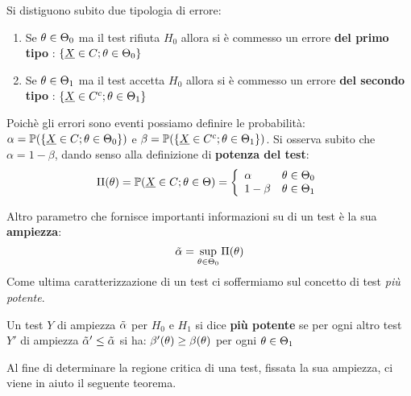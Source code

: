 Si distiguono subito due tipologia di errore:
\begin{enumerate}
    \item Se $\theta\in\Theta_0$ ma il test rifiuta $H_0$ allora si è commesso un errore \textbf{del primo tipo} : $\{\underline{X}\in C ; \theta\in\Theta_0\}$
    \item Se $\theta\in\Theta_1$ ma il test accetta $H_0$ allora si è commesso un errore \textbf{del secondo tipo} : $\{\underline{X}\in C^c ; \theta\in\Theta_1\}$
\end{enumerate}
Poichè gli errori sono eventi possiamo definire le probabilità: $\alpha = \mathbb{P}(\{\underline{X}\in C ; \theta\in\Theta_0\})$ e $\beta = \mathbb{P}(\{\underline{X}\in C^c ; \theta\in\Theta_1\})$.
\vspace{5px}
Si osserva subito che $\alpha = 1 - \beta$, dando senso alla definizione di \textbf{potenza del test}:
\[\Pi(\theta)=\mathbb{P}(\underline{X}\in C ; \theta\in\Theta) = \left\{
     \begin{array}{lr}
       \alpha &  \theta \in \Theta_0\\
       1-\beta &  \theta\in\Theta_1
     \end{array}
   \right.\]
   
Altro parametro che fornisce importanti informazioni su di un test è la sua \textbf{ampiezza}: \[\Tilde{\alpha}=\sup\limits_{\theta\in\Theta_0}\Pi(\theta)\]   
Come ultima caratterizzazione di un test ci soffermiamo sul concetto di test \textit{più potente}.
   
\begin{definition}
   Un test $Y$ di ampiezza $\Tilde{\alpha}$ per $H_0$ e $H_1$ si dice \textbf{più potente} se per ogni altro test $Y'$ di ampiezza $\Tilde{\alpha}'\leq\Tilde{\alpha}$ si ha: $\beta'(\theta)\geq\beta(\theta)$ per ogni $\theta\in\Theta_1$
\end{definition}
   
   
Al fine di determinare la regione critica di una test, fissata la sua ampiezza, ci viene in aiuto il seguente teorema.

